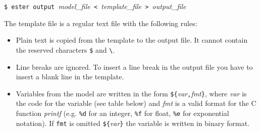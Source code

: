 \medskip
\noindent
\verb|$ ester output |{\it model\_file}\verb| < |{\it template\_file}\verb| > |{\it output\_file}

\medskip

The template file is a regular text file with the following rules:
\begin{itemize}
\item Plain text is copied from the template to the output file. It cannot contain 
the reserved characters {\tt \$} and {\tt \textbackslash}.
\item Line breaks are ignored. To insert a line break in the output file you have to insert
a blank line in the template.
\item Variables from the model are written in the form 
\mbox{{\tt \$\{}{\it var}{\tt ,}{\it fmt}{\tt \}}}, where {\it var} is the code for the
variable (see table below) and {\it fmt} is a valid format for the C function {\it printf} 
(e.g. {\tt \%d} for an integer, {\tt \%f} for float, {\tt \%e} for exponential notation).
If {\tt fmt} is omitted {\tt\$\{}{\it var}{\tt \}} the variable is written in binary format.
\end{itemize}
\pagebreak
